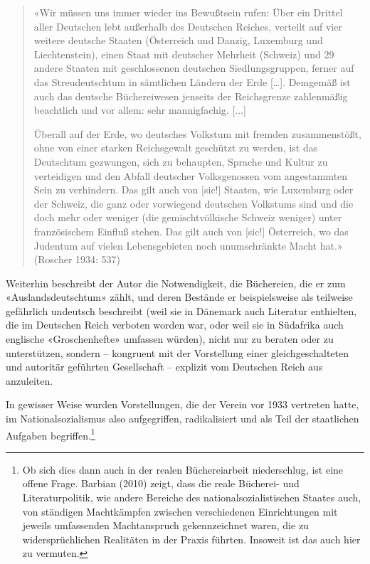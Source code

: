 \documentclass[a4paper,
fontsize=11pt,
oneside,
numbers=noperiodatend,
parskip=half-,
bibliography=totoc,
final
]{scrartcl}
\begin{document}
\begin{quote}
«Wir müssen uns immer wieder ins Bewußtsein rufen: Über ein Drittel
aller Deutschen lebt außerhalb des Deutschen Reiches, verteilt auf vier
weitere deutsche Staaten (Österreich und Danzig, Luxemburg und
Liechtenstein), einen Staat mit deutscher Mehrheit (Schweiz) und 29
andere Staaten mit geschlossenen deutschen Siedlungsgruppen, ferner auf
das Streudeutschtum in sämtlichen Ländern der Erde {[}\ldots{]}.
Demgemäß ist auch das deutsche Büchereiwesen jenseits der Reichsgrenze
zahlenmäßig beachtlich und vor allem: sehr mannigfachig. {[}...{]}

Überall auf der Erde, wo deutsches Volkstum mit fremden zusammenstößt,
ohne von einer starken Reichsgewalt geschützt zu werden, ist das
Deutschtum gezwungen, sich zu behaupten, Sprache und Kultur zu
verteidigen und den Abfall deutscher Volksgenossen vom angestammten Sein
zu verhindern. Das gilt auch von {[}sic!{]} Staaten, wie Luxemburg oder
der Schweiz, die ganz oder vorwiegend deutschen Volkstums sind und die
doch mehr oder weniger (die gemischtvölkische Schweiz weniger) unter
französischem Einfluß stehen. Das gilt auch von {[}sic!{]} Österreich,
wo das Judentum auf vielen Lebensgebieten noch unumschränkte Macht hat.»
(Roscher 1934: 537)
\end{quote}

Weiterhin beschreibt der Autor die Notwendigkeit, die Büchereien, die er
zum «Auslandsdeutschtum» zählt, und deren Bestände er beispielsweise als
teilweise gefährlich undeutsch beschreibt (weil sie in Dänemark auch
Literatur enthielten, die im Deutschen Reich verboten worden war, oder
weil sie in Südafrika auch englische «Groschenhefte» umfassen würden),
nicht nur zu beraten oder zu unterstützen, sondern -- kongruent mit der
Vorstellung einer gleichgeschalteten und autoritär geführten
Gesellschaft -- explizit vom Deutschen Reich aus anzuleiten.

In gewisser Weise wurden Vorstellungen, die der Verein vor 1933
vertreten hatte, im Nationalsozialismus also aufgegriffen, radikalisiert
und als Teil der staatlichen Aufgaben begriffen.\footnote{Ob sich dies
  dann auch in der realen Büchereiarbeit niederschlug, ist eine offene
  Frage. Barbian (2010) zeigt, dass die reale Bücherei- und
  Literaturpolitik, wie andere Bereiche des nationalsozialistischen
  Staates auch, von ständigen Machtkämpfen zwischen verschiedenen
  Einrichtungen mit jeweils umfassenden Machtanspruch gekennzeichnet
  waren, die zu widersprüchlichen Realitäten in der Praxis führten.
  Insoweit ist das auch hier zu vermuten.}
\end{document}
